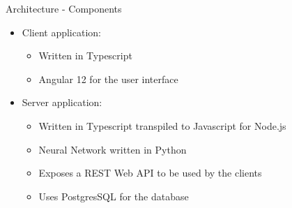 \documentclass[newPxFont,noprogressbar,table]{beamer}
\begin{document}
	\begin{frame}{Architecture - Components }
		
		\vspace*{-4em} 
		
		\begin{itemize}
			\item \textcolor{sthlmBlue}{Client application:}
			\begin{itemize}
				\item Written in Typescript
				\item Angular 12 for the user interface
			\end{itemize}
			\item \textcolor{sthlmBlue}{Server application:}  
			\begin{itemize}
				\item Written in Typescript transpiled to Javascript for Node.js
				\item Neural Network written in Python
				\item Exposes a REST Web API to be used by the clients
				\item Uses PostgresSQL for the database
			\end{itemize}
			
		\end{itemize}
		
	\end{frame}
	
\end{document}
